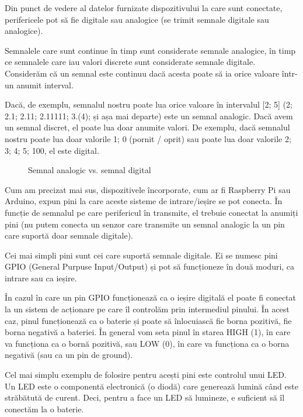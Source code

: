 Din punct de vedere al datelor furnizate dispozitivului la care sunt conectate,
perifericele pot să fie digitale sau analogice (se trimit semnale digitale sau
analogice).

Semnalele care sunt continue în timp sunt considerate semnale analogice, în timp
ce semnalele care iau valori discrete sunt considerate semnale digitale.
Considerăm că un semnal este continuu dacă acesta poate să ia orice valoare
într-un anumit interval.

Dacă, de exemplu, semnalul nostru poate lua orice valoare în intervalul [2; 5]
(2; 2.1; 2.11; 2.11111; 3.(4); și așa mai departe) este un semnal analogic. Dacă
avem un semnal discret, el poate lua doar anumite valori. De exemplu, dacă
semnalul nostru poate lua doar valorile {1; 0} (pornit / oprit) sau poate lua
doar valorile {2; 3; 4; 5; 100}, el este digital.

\begin{figure}[htbp]
	\centering
	\def\svgwidth{\columnwidth}
	
	\caption{Semnal analogic vs. semnal digital}
	\label{fig:embed-analog-digital}
\end{figure}

Cum am precizat mai sus, dispozitivele încorporate, cum ar fi Raspberry Pi sau
Arduino, expun pini la care aceste sisteme de intrare/ieșire se pot conecta. În
funcție de semnalul pe care perifericul în transmite, el trebuie conectat la
anumiți pini (nu putem conecta un senzor care transmite un semnal analogic la un
pin care suportă doar semnale digitale).

Cei mai simpli pini sunt cei care suportă semnale digitale. Ei se numesc pini
GPIO (General Purpuse Input/Output) și pot să funcționeze în două moduri, ca
intrare sau ca ieșire.

În cazul în care un pin GPIO funcționează ca o ieșire digitală el poate fi
conectat la un sistem de acționare pe care îl controlăm prin intermediul
pinului. În acest caz, pinul funcționează ca o baterie și poate să înlocuiască
fie borna pozitivă, fie borna negativă a bateriei. În general vom seta pinul în
starea HIGH (1), în care va funcționa ca o bornă pozitivă, sau LOW (0), în care
va funcționa ca o borna negativă (sau ca un pin de ground).

Cel mai simplu exemplu de folosire pentru acești pini este controlul unui LED.
Un LED este o componentă electronică (o diodă) care generează lumină când este
străbătută de curent. Deci, pentru a face un LED să lumineze, e suficient să îl
conectăm la o baterie.

